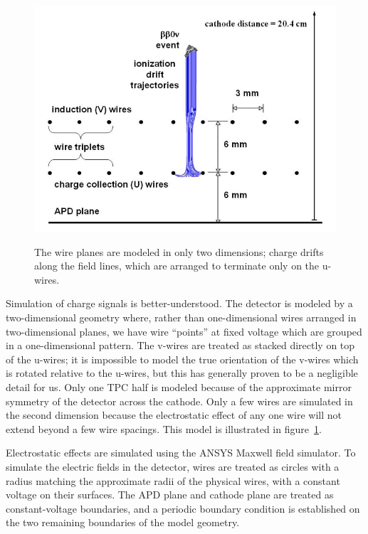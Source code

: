 \begin{figure}
\begin{center}
\includegraphics[keepaspectratio=true,width=\textwidth]{ChargeDrift2DModel.png}
\end{center}
\renewcommand{\baselinestretch}{1}
\small\normalsize
\begin{quote}
\caption{The wire planes are modeled in only two dimensions; charge drifts along the field lines, which are arranged to terminate only on the u-wires.~\cite{MCDocumentRun2a}}
\label{fig:TwoDimensionalWireModel}
\end{quote}
\end{figure}
\renewcommand{\baselinestretch}{2}
\small\normalsize

Simulation of charge signals is better-understood.  The detector is modeled by a two-dimensional geometry where, rather than one-dimensional wires arranged in two-dimensional planes, we have wire ``points'' at fixed voltage which are grouped in a one-dimensional pattern.  The v-wires are treated as stacked directly on top of the u-wires; it is impossible to model the true orientation of the v-wires which is rotated relative to the u-wires, but this has generally proven to be a negligible detail for us.  Only one TPC half is modeled because of the approximate mirror symmetry of the detector across the cathode.  Only a few wires are simulated in the second dimension because the electrostatic effect of any one wire will not extend beyond a few wire spacings.  This model is illustrated in figure~\ref{fig:TwoDimensionalWireModel}.~\cite{MCDocumentRun2a}

Electrostatic effects are simulated using the ANSYS Maxwell field simulator.  To simulate the electric fields in the detector, wires are treated as circles with a radius matching the approximate radii of the physical wires, with a constant voltage on their surfaces.  The APD plane and cathode plane are treated as constant-voltage boundaries, and a periodic boundary condition is established on the two remaining boundaries of the model geometry.

